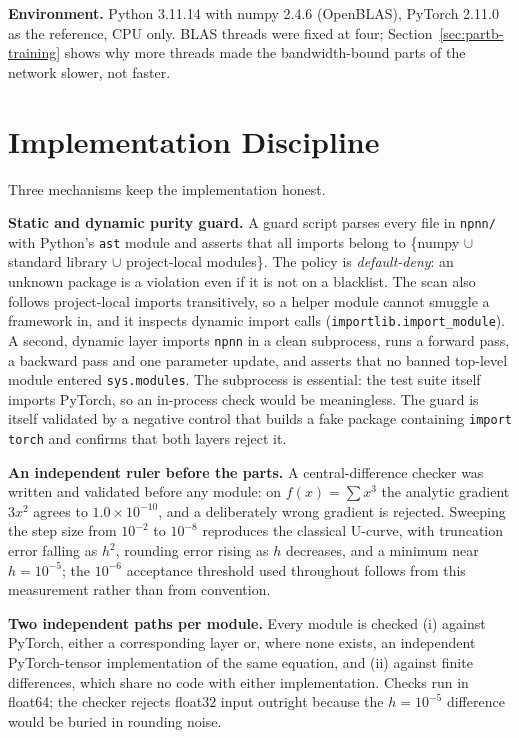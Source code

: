 \textbf{Environment.} Python 3.11.14 with numpy 2.4.6 (OpenBLAS), PyTorch 2.11.0 as the reference,
CPU only. BLAS threads were fixed at four; Section~\ref{sec:partb-training} shows why more threads
made the bandwidth-bound parts of the network slower, not faster.

\section{Implementation Discipline}
\label{sec:partb-discipline}

Three mechanisms keep the implementation honest.

\textbf{Static and dynamic purity guard.} A guard script parses every file in \texttt{npnn/} with
Python's \texttt{ast} module and asserts that all imports belong to \{numpy $\cup$ standard library
$\cup$ project-local modules\}. The policy is \emph{default-deny}: an unknown package is a violation
even if it is not on a blacklist. The scan also follows project-local imports transitively, so a
helper module cannot smuggle a framework in, and it inspects dynamic import calls
(\texttt{importlib.import\_module}). A second, dynamic layer imports \texttt{npnn} in a clean
subprocess, runs a forward pass, a backward pass and one parameter update, and asserts that no
banned top-level module entered \texttt{sys.modules}. The subprocess is essential: the test suite
itself imports PyTorch, so an in-process check would be meaningless. The guard is itself validated
by a negative control that builds a fake package containing \texttt{import torch} and confirms that
both layers reject it.

\textbf{An independent ruler before the parts.} A central-difference checker was written and
validated before any module: on $f(x)=\sum x^3$ the analytic gradient $3x^2$ agrees to
$1.0\times10^{-10}$, and a deliberately wrong gradient is rejected. Sweeping the step size from
$10^{-2}$ to $10^{-8}$ reproduces the classical U-curve, with truncation error falling as $h^2$,
rounding error rising as $h$ decreases, and a minimum near $h=10^{-5}$; the $10^{-6}$ acceptance
threshold used throughout follows from this measurement rather than from convention.

\textbf{Two independent paths per module.} Every module is checked (i) against PyTorch, either a
corresponding layer or, where none exists, an independent PyTorch-tensor implementation of the same
equation, and (ii) against finite differences, which share no code with either implementation.
Checks run in float64; the checker rejects float32 input outright because the $h=10^{-5}$ difference
would be buried in rounding noise.

